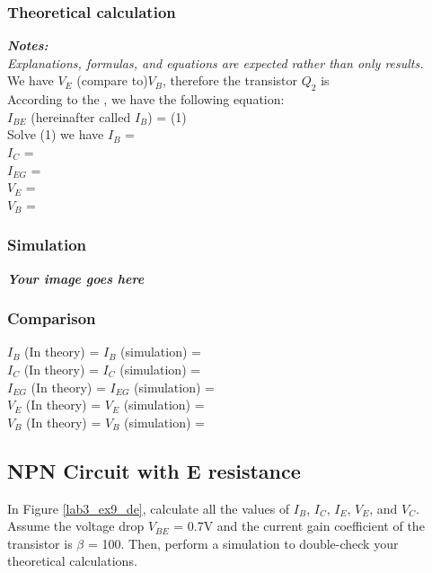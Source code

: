 \subsubsection{Theoretical calculation}
\textit{\textbf{Notes:}}\\
\textit{Explanations, formulas, and equations are expected rather than only results.}
\bigskip\\
We have $V_E$ (compare to)\dotfill $V_B$, therefore the transistor $Q_2$ is \dotfill\\
According to the \dotfill, we have the following equation:\bigskip\\
$I_{BE}$ (hereinafter called $I_B$) = \dotfill (1)\bigskip\\
Solve (1) we have $I_B$ = \dotfill\bigskip\\
$I_C$ = \dotfill\bigskip\\
$I_{EG}$ = \dotfill\bigskip\\
$V_E$ = \dotfill\bigskip\\
$V_B$ = \dotfill\bigskip\\

\subsubsection{Simulation}
\textbf{\textit{Your image goes here}}
\vspace{8cm}

\subsubsection{Comparison}
$I_B$ (In theory) = \dotfill $I_B$ (simulation) = \dotfill\bigskip\\
$I_C$ (In theory) = \dotfill $I_C$ (simulation) = \dotfill\bigskip\\
$I_{EG}$ (In theory) = \dotfill $I_{EG}$ (simulation) = \dotfill\bigskip\\
$V_E$ (In theory) = \dotfill $V_E$ (simulation) = \dotfill\bigskip\\
$V_B$ (In theory) = \dotfill $V_B$ (simulation) = \dotfill\bigskip\\

\subsection{NPN Circuit with E resistance}
In Figure \ref{lab3_ex9_de}, calculate all the values of $I_B$, $I_C$, $I_E$, $V_E$, and $V_C$. Assume the voltage drop $V_{BE}$ = 0.7V and the current gain coefficient of the transistor is $\beta$ = 100. Then, perform a simulation to double-check your theoretical calculations.

